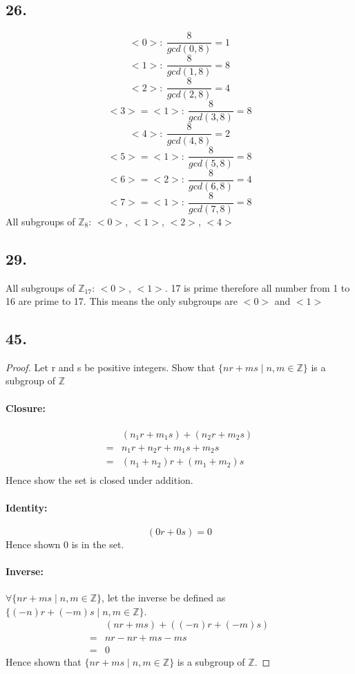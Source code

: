 \documentclass{article}
\begin{document}
\subsection*{26. }
	$$<0>:\ \frac{8}{gcd(0, 8)} = 1$$
	$$<1>:\ \frac{8}{gcd(1, 8)} = 8$$
	$$<2>:\ \frac{8}{gcd(2, 8)} = 4$$
	$$<3>=<1>:\ \frac{8}{gcd(3, 8)} = 8$$
	$$<4>:\ \frac{8}{gcd(4, 8)} = 2$$
	$$<5>=<1>:\ \frac{8}{gcd(5, 8)} = 8$$
	$$<6>=<2>:\ \frac{8}{gcd(6, 8)} = 4$$
	$$<7>=<1>:\ \frac{8}{gcd(7, 8)} = 8$$
	All subgroups of $\mathbb{Z}_8$: $<0>$, $<1>$, $<2>$, $<4>$
	
\subsection*{29. }
All subgroups of $\mathbb{Z}_{17}$: $<0>$, $<1>$. 17 is prime therefore all
number from 1 to 16 are prime to 17. This means the only subgroups are $<0>$ and
$<1>$

\subsection*{45. }
\begin{proof}
Let r and s be positive integers. Show that $\{nr + ms \mid n, m \in
	\mathbb{Z}\}$ is a subgroup of $\mathbb{Z}$
	\paragraph{Closure: } 
		\begin{align*}
			&(n_1r+m_1s) + (n_2r+m_2s)\\
			=& n_1r+ n_2r + m_1s + m_2s\\
			=& (n_1+ n_2)r + (m_1 + m_2)s\\
		\end{align*}
		Hence show the set is closed under addition.

	\paragraph{Identity: }
		$$(0r+0s) = 0$$
		Hence shown 0 is in the set.

	\paragraph{Inverse: }$\forall \{nr + ms \mid n, m \in \mathbb{Z}\}$, let the
	inverse be defined as $\{(-n)r + (-m)s \mid n, m \in \mathbb{Z}\}$.
		\begin{align*}
			&(nr + ms) + ((-n)r + (-m)s)\\
			=& nr - nr + ms - ms\\
			=& 0
		\end{align*}
	Hence shown that $\{nr + ms \mid n, m \in \mathbb{Z}\}$ is a subgroup of
	$\mathbb{Z}$.
\end{proof}
\end{document}
